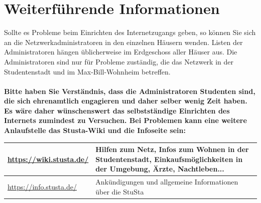 \documentclass[a4paper,12pt]{scrartcl}
\begin{document}
\section*{Weiterführende Informationen}

Sollte es Probleme beim Einrichten des Internetzugangs geben, so können Sie sich an die Netzwerkadministratoren in den einzelnen Häusern wenden. Listen der Administratoren hängen üblicherweise im Erdgeschoss aller Häuser aus. Die Administratoren sind nur für Probleme zuständig, die das Netzwerk in der Studentenstadt und im Max-Bill-Wohnheim betreffen.
\\
\\
\textbf{Bitte haben Sie Verständnis, dass die Administratoren Studenten sind, die sich ehrenamtlich engagieren und daher selber wenig Zeit haben. Es wäre daher wünschenswert das selbstständige Einrichten des Internets zumindest zu Versuchen. Bei Problemen kann eine weitere Anlaufstelle das Stusta-Wiki und die Infoseite sein:}
\\
\begin{center}
  \begin{tabularx}{\linewidth}{|lX|}
    \hline
    \url{https://wiki.stusta.de/} & Hilfen zum Netz, Infos zum Wohnen in der Studentenstadt, Einkaufsmöglichkeiten in der Umgebung, Ärzte, Nachtleben...\\
    \hline
    \url{https://info.stusta.de/} & Ankündigungen und allgemeine Informationen über die StuSta\\
    \hline
  \end{tabularx}
\end{center}



\end{document}

